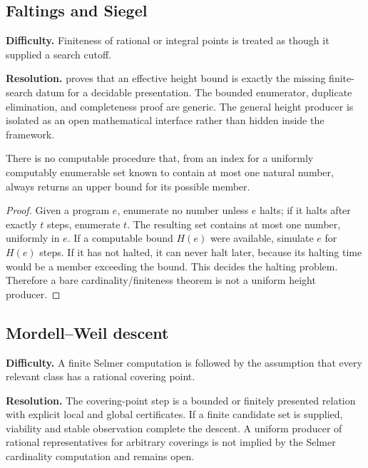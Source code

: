 \subsection{Faltings and Siegel}

\textbf{Difficulty.}  Finiteness of rational or integral points is treated as though it supplied a search cutoff.

\textbf{Resolution.}   proves that an effective height bound is exactly the missing finite-search datum for a decidable presentation.  The bounded enumerator, duplicate elimination, and completeness proof are generic.  The general height producer is isolated as an open mathematical interface rather than hidden inside the framework.

\begin{barrier}\label{barrier:finiteness}
There is no computable procedure that, from an index for a uniformly computably enumerable set known to contain at most one natural number, always returns an upper bound for its possible member.
\end{barrier}

\begin{proof}
Given a program \(e\), enumerate no number unless \(e\) halts; if it halts after exactly \(t\) steps, enumerate \(t\).  The resulting set contains at most one number, uniformly in \(e\).  If a computable bound \(H(e)\) were available, simulate \(e\) for \(H(e)\) steps.  If it has not halted, it can never halt later, because its halting time would be a member exceeding the bound.  This decides the halting problem.  Therefore a bare cardinality/finiteness theorem is not a uniform height producer.
\end{proof}

\subsection{Mordell--Weil descent}

\textbf{Difficulty.}  A finite Selmer computation is followed by the assumption that every relevant class has a rational covering point.

\textbf{Resolution.}  The covering-point step is a bounded or finitely presented relation with explicit local and global certificates.  If a finite candidate set is supplied, viability and stable observation complete the descent.  A uniform producer of rational representatives for arbitrary coverings is not implied by the Selmer cardinality computation and remains open.

